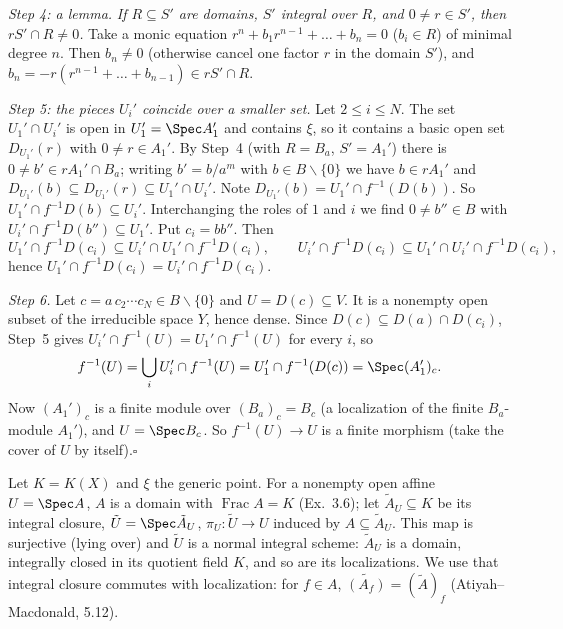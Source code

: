 \documentclass[11pt]{article}
\begin{document}
\emph{Step 4: a lemma.} \emph{If $R\subseteq S'$ are domains, $S'$ integral over $R$, and $0\ne r\in S'$, then $rS'\cap R\ne0$.} Take a monic equation $r^n+b_1r^{n-1}+\dots+b_n=0$ ($b_i\in R$) of minimal degree $n$. Then $b_n\ne0$ (otherwise cancel one factor $r$ in the domain $S'$), and $b_n=-r(r^{n-1}+\dots+b_{n-1})\in rS'\cap R$.

\emph{Step 5: the pieces $U_i'$ coincide over a smaller set.} Let $2\le i\le N$. The set $U_1'\cap U_i'$ is open in $U_1'=\Spec A_1'$ and contains $\xi$, so it contains a basic open set $D_{U_1'}(r)$ with $0\ne r\in A_1'$. By Step~4 (with $R=B_a$, $S'=A_1'$) there is $0\ne b'\in rA_1'\cap B_a$; writing $b'=b/a^m$ with $b\in B\smallsetminus\{0\}$ we have $b\in rA_1'$ and $D_{U_1'}(b)\subseteq D_{U_1'}(r)\subseteq U_1'\cap U_i'$. Note $D_{U_1'}(b)=U_1'\cap f^{-1}(D(b))$. So $U_1'\cap f^{-1}D(b)\subseteq U_i'$. Interchanging the roles of $1$ and $i$ we find $0\ne b''\in B$ with $U_i'\cap f^{-1}D(b'')\subseteq U_1'$. Put $c_i=bb''$. Then
\[U_1'\cap f^{-1}D(c_i)\subseteq U_i'\cap U_1'\cap f^{-1}D(c_i),\qquad U_i'\cap f^{-1}D(c_i)\subseteq U_1'\cap U_i'\cap f^{-1}D(c_i),\]
hence $U_1'\cap f^{-1}D(c_i)=U_i'\cap f^{-1}D(c_i)$.

\emph{Step 6.} Let $c=a\,c_2\cdots c_N\in B\smallsetminus\{0\}$ and $U=D(c)\subseteq V$. It is a nonempty open subset of the irreducible space $Y$, hence dense. Since $D(c)\subseteq D(a)\cap D(c_i)$, Step~5 gives $U_i'\cap f^{-1}(U)=U_1'\cap f^{-1}(U)$ for every $i$, so
\[f^{-1}(U)=\bigcup_iU_i'\cap f^{-1}(U)=U_1'\cap f^{-1}(D(c))=\Spec (A_1')_c.\]
Now $(A_1')_c$ is a finite module over $(B_a)_c=B_c$ (a localization of the finite $B_a$-module $A_1'$), and $U=\Spec B_c$. So $f^{-1}(U)\to U$ is a finite morphism (take the cover of $U$ by itself).\hfill$\square$

\pf
Let $K=K(X)$ and $\xi$ the generic point. For a nonempty open affine $U=\Spec A$, $A$ is a domain with $\operatorname{Frac}A=K$ (Ex.~3.6); let $\tilde A_U\subseteq K$ be its integral closure, $\tilde U=\Spec\tilde A_U$, $\pi_U:\tilde U\to U$ induced by $A\subseteq\tilde A_U$. This map is surjective (lying over) and $\tilde U$ is a normal integral scheme: $\tilde A_U$ is a domain, integrally closed in its quotient field $K$, and so are its localizations. We use that integral closure commutes with localization: for $f\in A$, $\tilde{(A_f)}=(\tilde A)_f$ (Atiyah--Macdonald, 5.12).
\end{document}
